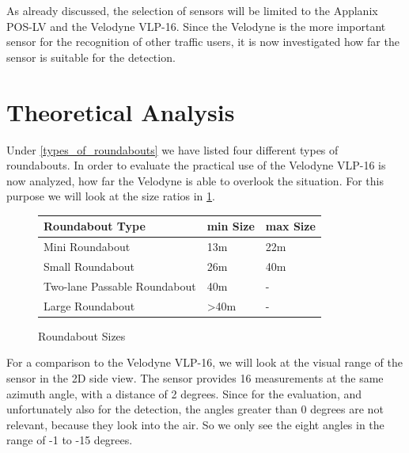 \documentclass[11pt,oneside,openright]{mpreport}
\begin{document}
As already discussed, the selection of sensors will be limited to the Applanix POS-LV and the Velodyne VLP-16. Since the Velodyne is the more
important sensor for the recognition of other traffic users, it is now investigated how far the sensor is suitable for the detection.

\section{Theoretical Analysis}

Under \cref{types_of_roundabouts} we have listed four different types of roundabouts. In order to evaluate the practical use of the Velodyne VLP-16 is now analyzed,
how far the Velodyne is able to overlook the situation. For this purpose we will look at the size ratios in \cref{roundabout_size}.

\begin{figure}[!ht]
\caption{Roundabout Sizes}
  \begin{tabularx}{\textwidth}{X|X|X}
  \hline \textbf{Roundabout Type} & \textbf{min Size} & \textbf{max Size} \\\hline
  Mini Roundabout& 13m & 22m \\\hline
  Small Roundabout& 26m  & 40m \\\hline
  Two-lane Passable Roundabout& 40m & - \\\hline
  Large Roundabout& >40m &  - \\
  \end{tabularx}
\label{roundabout_size}
\end{figure}




For a comparison to the Velodyne VLP-16, we will look at the visual range of the sensor in the 2D side view. The sensor provides 16 measurements at the same azimuth angle,
with a distance of 2 degrees. Since for the evaluation, and unfortunately also for the detection, the angles greater than 0 degrees are not relevant, because they look into
the air. So we only see the eight angles in the range of -1 to -15 degrees.
\end{document}
